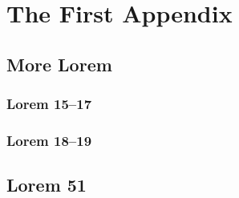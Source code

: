\chapter{The First Appendix}
\label{app:A}





\section{More Lorem}
\lipsum[50]

\subsection{Lorem 15--17}
\lipsum[15-17]

\subsection{Lorem 18--19}
\lipsum[18-19]

\section{Lorem 51}
\lipsum[51]

